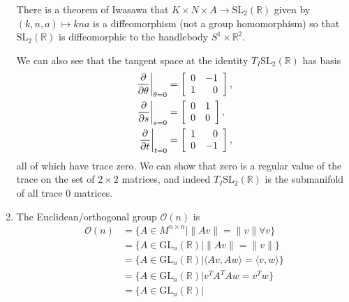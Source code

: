 \begin{xmpl}
\begin{enumerate}
{      There is a theorem of Iwasawa that
      $K \times N \times A \to \mathrm{SL}_2(\mathbb{R})$ given by
      $(k, n, a) \mapsto k n a$ is a diffeomorphism (not a
      group homomorphism) so that
      $\mathrm{SL}_2(\mathbb{R})$ is diffeomorphic to the handlebody
      $S^1 \times \mathbb{R}^2$.

      We can also see that the tangent space at the identity
      $T_I \mathrm{SL}_2(\mathbb{R})$ has basis
      \begin{align*}
        \left.\frac{\partial}{\partial \theta}\right|_{\theta = 0}
      &= \left[
           \begin{array}{r r}
             0 & -1 \\
             1 &  0
           \end{array}
         \right], \\
         \left.\frac{\partial}{\partial s}\right|_{s = 0}
      &= \left[
           \begin{array}{r r}
             0 &  1 \\
             0 &  0
           \end{array}
         \right], \\
      \left.\frac{\partial}{\partial t}\right|_{t = 0}
      &= \left[
           \begin{array}{r r}
             1 &  0 \\
             0 & -1
           \end{array}
         \right],
      \end{align*}
      all of which have trace zero. We can show that zero is a regular
      value of the trace on the set of $2 \times 2$ matrices, and
      indeed $T_I \mathrm{SL}_2(\mathbb{R})$ is the submanifold of all
      trace 0 matrices.
    }
    \item{
      The Euclidean/orthogonal group $\mathcal{O}(n)$ is
      \begin{align*}
         \mathcal{O}(n)
      &= \{ A \in M^{n \times n} \vert \| A v \| = \| v \| \forall v
         \} \\
      &= \{ A \in \mathrm{GL}_n(\mathbb{R}) \vert
            \| A v \| = \| v \|
         \} \\
      &=  \{ A \in \mathrm{GL}_n(\mathbb{R}) \vert
            \langle A v, A w \rangle = \langle v, w \rangle
         \} \\
      &= \{ A \in \mathrm{GL}_n(\mathbb{R}) \vert
            v^T A^T A w = v^T w
         \} \\
      &= \{ A \in \mathrm{GL}_n(\mathbb{R}) \vert

\end{align*}}
\end{enumerate}
\end{xmpl}
